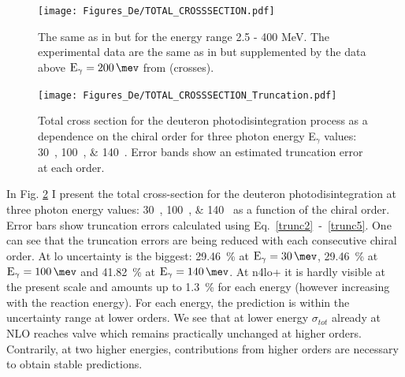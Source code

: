     
    \begin{figure}[htb!]
        \begin{center}
        \texttt{[image: Figures\_De/TOTAL\_CROSSSECTION.pdf]}
        \end{center}
        \caption{The same as in  but for the energy range 2.5 - 400 MeV.
        The experimental data are the same as in 
        but supplemented by the data above $\text{E}_\gamma=\SI{200}{\mev}$ from
        \cite{ARENDS1984} (crosses).
        }
        \label{TOTAL_CROSS}
    \end{figure}

    \begin{figure}[htb!]
        \begin{center}
            \texttt{[image: Figures\_De/TOTAL\_CROSSSECTION\_Truncation.pdf]}
        \end{center}
        \caption{Total cross section for the deuteron photodisintegration
        process as a dependence on the chiral order for three photon energy E$_\gamma$ values: \SIlist[list-units = single]{30;100;140}{\mev}.
        Error bands show an estimated truncation error at each order.}
        \label{Trunc_100}
    \end{figure}
    
    In Fig. \ref{Trunc_100} I present the total cross-section for the deuteron photodisintegration 
    at three photon energy values: \SIlist[list-units = single]{30;100;140}{\mev} as a function of the chiral order.
    Error bars show truncation errors calculated using Eq.~\ref{trunc2}~-~\ref{trunc5}.
    One can see that the truncation errors are being reduced with each consecutive chiral order. 
    At \gls{lo} uncertainty is the biggest: \SI{29.46}{\percent} at $\text{E}_\gamma = \SI{30}{\mev}$,
    \SI{29.46}{\percent} at $\text{E}_\gamma = \SI{100}{\mev}$ and
    \SI{41.82}{\percent} at $\text{E}_\gamma = \SI{140}{\mev}$.
    At \gls{n4lo+} it is hardly visible at the present scale and amounts up to 
    \SI{1.3}{\percent} for each energy (however increasing with the reaction energy).
    For each energy, the prediction is within the uncertainty range at lower orders.
    We see that at lower energy $\sigma_{tot}$ already at NLO reaches valve which remains
    practically unchanged at higher orders.
    Contrarily, at two higher energies, contributions from higher orders are necessary to obtain 
    stable predictions.

